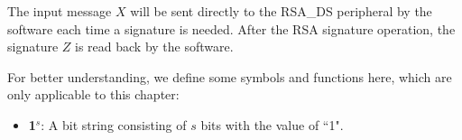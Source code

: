 \documentclass[main\_\_EN.tex]{subfiles}
\begin{document}
The input message \begin{math}X\end{math} will be sent directly to the RSA\_DS peripheral by the software each time a signature is needed. After the RSA signature operation, the signature \begin{math}Z\end{math} is read back by the software.

For better understanding, we define some symbols and functions here, which are only applicable to this chapter:

\begin{itemize}

    \item {\bfseries 1\begin{math}^s\end{math}}:
    A bit string consisting of \begin{math}s\end{math} bits with the value of ``1".


\end{itemize}
\end{document}
